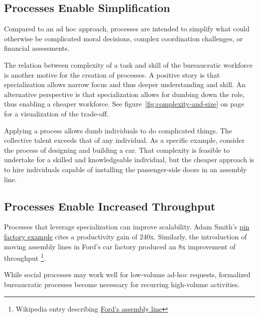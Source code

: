 \subsection*{Processes Enable Simplification}
Compared to an ad hoc approach, processes are intended to simplify what could otherwise be complicated moral decisions, complex coordination challenges, or financial assessments. %


The relation between complexity of a task and skill of the bureaucratic workforce is another motive for the creation of processes.
A positive story is that specialization allows narrow focus and thus deeper understanding and skill. An alternative perspective is that specialization allows for dumbing down the role, thus enabling a cheaper workforce. See figure~\ref{fig:complexity-and-size} on page~\pageref{fig:complexity-and-size} for a visualization of the trade-off.

Applying a process allows dumb individuals to do complicated things. The collective talent exceeds that of any individual.  As a specific example, consider the process of designing and building a car. That complexity is feasible to undertake for a skilled and knowledgeable individual, but the cheaper approach is to hire individuals capable of installing the passenger-side doors in an assembly line.


\subsection*{Processes Enable Increased Throughput}

Processes that leverage specialization can improve scalability. Adam Smith's \href{https://en.wikipedia.org/wiki/Business_process#Adam_Smith}{pin factory example} cites a productivity gain of 240x.
Similarly, the introduction of moving assembly lines in Ford's car factory produced an 8x improvement of throughput \footnote{Wikipedia entry describing \hyperlink{https://en.wikipedia.org/wiki/Assembly_line\%2320th_century}{Ford's assembly line}
}. 


While social processes may work well for low-volume ad-hoc requests, formalized bureaucratic processes become necessary for recurring high-volume activities.


